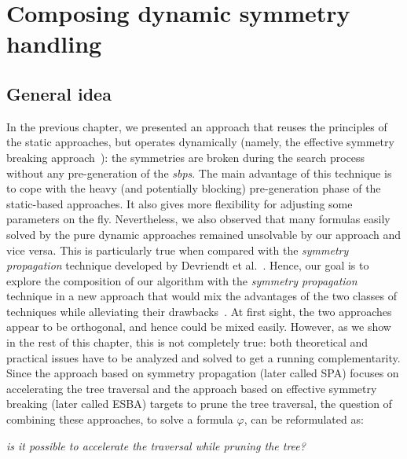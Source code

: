 \chapter{Composing dynamic symmetry handling}\label{chap:compose}
\minitoc
\section{General idea}
In the previous chapter, we presented an approach that reuses the
principles of the static approaches, but operates dynamically (namely, the effective symmetry breaking approach~\cite{metin2018cdclsym}):
 the symmetries are broken during the search process without any pre-generation of the \textit{sbps}. The main
advantage of this technique is to cope with the heavy (and potentially
blocking) pre-generation phase of the static-based approaches. It also gives
more flexibility for adjusting some parameters on the fly. 
Nevertheless, we also observed that many formulas easily solved by the pure
dynamic approaches remained unsolvable by our approach and vice versa. This is
particularly true when compared with the \textit{symmetry propagation} technique developed by
Devriendt et al.~\cite{Devriendt12}.
Hence, our goal is to explore the composition of our algorithm with the  \textit{symmetry propagation} technique in
a new approach that would mix the advantages of the two classes of techniques while alleviating their drawbacks~\cite{metin2019composing}. At first sight,
the two approaches appear to be orthogonal, and hence could be mixed easily. However, as we show in the rest of this chapter,
this is not completely true: both theoretical and practical issues have to be analyzed and solved to get a
running complementarity. 
Since the approach based on symmetry propagation (later called SPA) focuses on
accelerating the tree traversal and the approach based on effective symmetry
breaking (later called ESBA) targets to prune the tree traversal, the question of combining these approaches, to solve a formula $\varphi$, can
be reformulated as: 
\begin{center}
 \textit{is it possible to accelerate the traversal while pruning the tree?}
\end{center}
